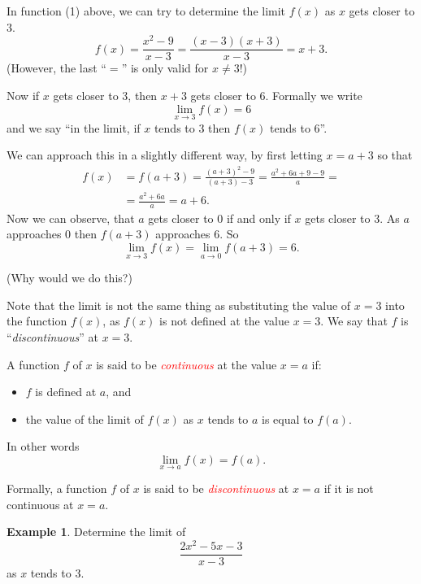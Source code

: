 \documentclass[
  11pt,
  oneside]{book}
\providecommand{\tightlist}{%
  \setlength{\itemsep}{0pt}\setlength{\parskip}{0pt}}
\newcommand{\slide}{}
\theoremstyle{definition}
\theoremstyle{definition}
\newtheorem{example}{Example}[chapter]
\theoremstyle{definition}
\theoremstyle{definition}
\theoremstyle{remark}
\begin{document}
\slide

In function (1) above, we can try to determine the limit \(f(x)\) as \(x\) gets closer to \(3\).
\[
f(x) = \frac{x^2-9}{x-3} = \frac{(x-3)(x+3)}{x-3} = x+3.
\]
(However, the last ``\(=\)'' is only valid for \(x\not=3\)!)

Now if \(x\) gets closer to \(3\), then \(x+3\) gets closer to \(6\). Formally we write
\[
\lim\limits_{x\to3} f(x) = 6
\]
and we say ``in the limit, if \(x\) tends to \(3\) then \(f(x)\) tends to 6''.

\slide

We can approach this in a slightly different way, by first letting \(x = a+3\) so that
\begin{align*}
f(x) &= f(a+3) = \frac{(a+3)^2-9}{(a+3)-3} = \frac{a^2+6a + 9 - 9}{a} =\\
&= \frac{a^2+6a}{a} = a+6.
\end{align*}
Now we can observe, that \(a\) gets closer to \(0\) if and only if \(x\) gets closer to \(3\). As \(a\) approaches \(0\) then \(f(a+3)\) approaches \(6\). So
\[
\lim\limits_{x\to3}f(x) = \lim\limits_{a\to0}f(a+3) = 6.
\]

(Why would we do this?)

\slide

Note that the limit is not the same thing as substituting the value of \(x=3\) into the function \(f(x)\), as \(f(x)\) is not defined at the value \(x=3\). We say that \(f\) is ``\emph{discontinuous}'' at \(x=3\).

A function \(f\) of \(x\) is said to be \textcolor{red}{\em continuous} at the value \(x=a\) if:

\begin{itemize}
\tightlist
\item
  \(f\) is defined at \(a\), and
\item
  the value of the limit of \(f(x)\) as \(x\) tends to \(a\) is equal to \(f(a)\).
\end{itemize}

In other words
\[
\lim\limits_{x\to a}f(x) = f(a).
\]

Formally, a function \(f\) of \(x\) is said to be \textcolor{red}{\em discontinuous} at \(x=a\) if it is not continuous at \(x=a\).
\slide

\begin{example}
Determine the limit of
\[
\frac{2x^2-5x-3}{x-3}
\]
as \(x\) tends to \(3\).
\end{example}
\end{document}
